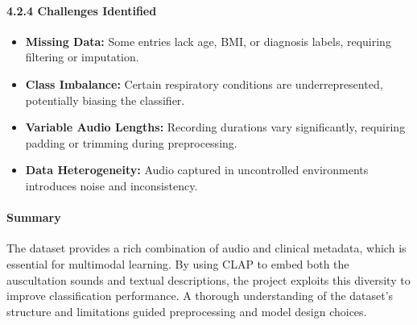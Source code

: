 \paragraph{4.2.4 Challenges Identified\\}
\begin{itemize}
    \item \textbf{Missing Data:} Some entries lack age, BMI, or diagnosis labels, requiring filtering or imputation.
    \item \textbf{Class Imbalance:} Certain respiratory conditions are underrepresented, potentially biasing the classifier.
    \item \textbf{Variable Audio Lengths:} Recording durations vary significantly, requiring padding or trimming during preprocessing.
    \item \textbf{Data Heterogeneity:} Audio captured in uncontrolled environments introduces noise and inconsistency.
\end{itemize}

\paragraph{Summary \\}
The dataset provides a rich combination of audio and clinical metadata, which is essential for multimodal learning. By using CLAP to embed both the auscultation sounds and textual descriptions, the project exploits this diversity to improve classification performance. A thorough understanding of the dataset’s structure and limitations guided preprocessing and model design choices.

